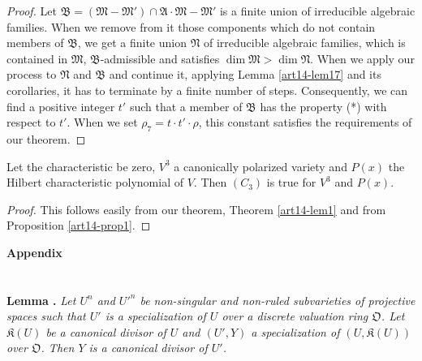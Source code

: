 \begin{proof}
Let $\mathfrak{B}=(\mathfrak{M}-\mathfrak{M}')\cap \mathfrak{A}\cdot \mathfrak{M}-\mathfrak{M}'$ is a finite union of irreducible algebraic families. When we remove from it those components which do not contain members of $\mathfrak{B}$, we get a finite union $\mathfrak{N}$ of irreducible algebraic families, which is contained in $\mathfrak{M}$, $\mathfrak{B}$-admissible and satisfies $\dim \mathfrak{M}>\dim \mathfrak{N}$. When we apply our process to $\mathfrak{N}$ and $\mathfrak{B}$ and continue it, applying Lemma \ref{art14-lem17} and its corollaries, it has to terminate by a finite number of steps. Consequently, we can find a positive integer $t'$ such that a member of $\mathfrak{B}$ has the property (*) with respect to $t'$. When we set $\rho_{7}=t\cdot t'\cdot \rho$, this constant satisfies the requirements of our theorem.
\end{proof}

\begin{coro*}
Let the characteristic be zero, $V^{3}$ a canonically polarized variety and $P(x)$ the Hilbert characteristic polynomial of $V$. Then $(C_{3})$ is true for $V^{3}$ and $P(x)$.
\end{coro*}

\begin{proof}
This follows easily from our theorem, Theorem \ref{art14-lem1} and from Proposition \ref{art14-prop1}.
\end{proof}

\bigskip

\begin{center}
{\Large\bf Appendix}
\end{center}

\setcounter{section}{0}
\section{}\label{art14-app-sec1}

\noindent
{\bf Lemma .\label{art14-app-lem1.1}}
{\em Let $U^{n}$ and ${U'}^{n}$ be non-singular and non-ruled subvarieties of projective spaces such that $U'$ is a specialization of $U$ over a discrete valuation ring $\mathfrak{O}$. Let $\mathfrak{K}(U)$ be a canonical divisor of $U$ and $(U',Y)$ a specialization of $(U,\mathfrak{K}(U))$ over $\mathfrak{O}$. Then $Y$ is a canonical divisor of $U'$.}

